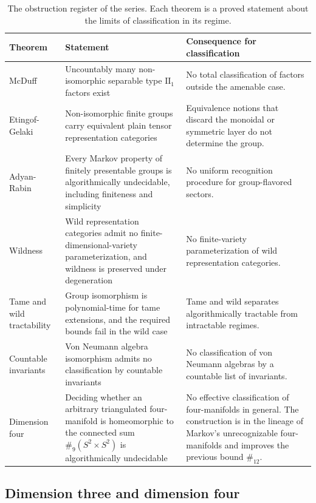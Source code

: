 \documentclass[11pt,letterpaper]{article}
\theoremstyle{definition}
\theoremstyle{remark}
\begin{document}
\begin{table}[t]
\centering
\small
\caption{The obstruction register of the series. Each theorem is a proved statement about the limits of classification in its regime.}
\label{tab:obstructions}
\begin{tabularx}{\textwidth}{Y{0.85}Y{1.10}Y{1.05}}
\toprule
Theorem & Statement & Consequence for classification \\
\midrule
McDuff \cite{corpus-65} & Uncountably many non-isomorphic separable type $\mathrm{II}_1$ factors exist & No total classification of factors outside the amenable case. \\
Etingof-Gelaki \cite{corpus-74} & Non-isomorphic finite groups carry equivalent plain tensor representation categories & Equivalence notions that discard the monoidal or symmetric layer do not determine the group. \\
Adyan-Rabin \cite{corpus-53} & Every Markov property of finitely presentable groups is algorithmically undecidable, including finiteness and simplicity & No uniform recognition procedure for group-flavored sectors. \\
Wildness \cite{corpus-55,corpus-56,corpus-58} & Wild representation categories admit no finite-dimensional-variety parameterization, and wildness is preserved under degeneration & No finite-variety parameterization of wild representation categories. \\
Tame and wild tractability \cite{corpus-57} & Group isomorphism is polynomial-time for tame extensions, and the required bounds fail in the wild case & Tame and wild separates algorithmically tractable from intractable regimes. \\
Countable invariants \cite{corpus-59} & Von Neumann algebra isomorphism admits no classification by countable invariants & No classification of von Neumann algebras by a countable list of invariants. \\
Dimension four \cite{corpus-54} & Deciding whether an arbitrary triangulated four-manifold is homeomorphic to the connected sum $\#_9(S^2 \times S^2)$ is algorithmically undecidable & No effective classification of four-manifolds in general. The construction is in the lineage of Markov's unrecognizable four-manifolds and improves the previous bound $\#_{12}$. \\
\bottomrule
\end{tabularx}
\end{table}

\subsection{Dimension three and dimension four}
\end{document}
